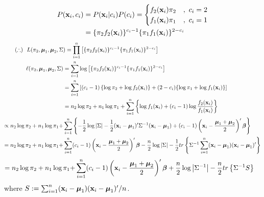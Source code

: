 \documentclass[11pt]{article}
\newcommand{\bbeta}     {\mbox{\boldmath{$\beta$}\unboldmath}}
\newcommand{\bmu}       {\mbox{\boldmath{$\mu$}\unboldmath}}
\newcommand{\bx}   {{\bf x}}
\begin{document}
	\begin{align*}
	P(\bx_i,c_i)&=P(\bx_i|c_i)P(c_i)=
	\begin{cases}
		f_2(\bx_i)\pi_2&,~c_i=2\\
		f_1(\bx_i)\pi_1&,~c_i=1
	\end{cases}\\
	&=\{\pi_2f_2(\bx_i)\}^{c_i-1}\{\pi_1f_1(\bx_i)\}^{2-c_i}
	\end{align*}
	\begin{align*}
	(\therefore)~~L(\pi_2,\bmu_1,\bmu_2,\Sigma&)=\prod_{i=1}^n \left[\{\pi_2 f_2(\bx_i)\}^{c_i-1}\{\pi_1f_1(\bx_i)\}^{2-c_i}\right]\\
	\ell(\pi_2,\bmu_1, \bmu_2, \Sigma)&=\sum_{i=1}^n\log\left[
	\{\pi_2 f_2(\bx_i)\}^{c_i-1}\{\pi_1f_1(\bx_i)\}^{2-c_i}
	\right]\\
	&=\sum_{i=1}^n\left[
	(c_i-1)\left\{\log\pi_2+ \log f_2(\bx_i)\right\}+(2-c_i)\{\log\pi_1+\log f_1(\bx_i)\}\right]\\
	&=n_2\log\pi_2+n_1\log\pi_1+\sum_{i=1}^n\left\{\log f_1(\bx_i)+(c_i-1)\log\frac{f_2(\bx_i)}{f_1(\bx_i)}\right\}\\
	\propto n_2\log\pi_2+n_1\log\pi_1+&\sum_{i=1}^n\left\{-\frac{1}{2}\log\left|\Sigma\right|-\frac{1}{2}(\bx_i-\bmu_1)'\Sigma^{-1}(\bx_i-\bmu_1)+(c_i-1)\left(\bx_i-\frac{\bmu_1+\bmu_2}{2}\right)'\bbeta\right\}\\
	=n_2\log\pi_2+n_1\log\pi_1+&\sum_{i=1}^n(c_i-1)\left(\bx_i-\frac{\bmu_1+\bmu_2}{2}\right)'\bbeta-\frac{n}{2}\log|\Sigma|-\frac{1}{2}tr\left\{\Sigma^{-1}\sum_{i=1}^n(\bx_i-\bmu_1)(\bx_i-\bmu_1)'\right\}
	\end{align*}
	\begin{align*}
	=n_2\log\pi_2+n_1\log\pi_1+&\sum_{i=1}^n(c_i-1)\left(\bx_i-\frac{\bmu_1+\bmu_2}{2}\right)'\bbeta+\frac{n}{2}\log\left|\Sigma^{-1}\right|-\frac{n}{2}tr\left\{\Sigma^{-1}S\right\}
	\end{align*}
	where $S:=\sum_{i=1}^n(\bx_i-\bmu_1)(\bx_i-\bmu_1)'/n$.
\end{document}

